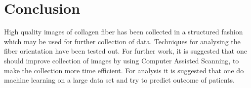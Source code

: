\chapter{Conclusion}
High quality images of collagen fiber has been collected in a structured fashion which may be used for further collection of data. Techniques for analysing the fiber orientation have been tested out. For further work, it is suggested that one should improve collection of images by using Computer Assisted Scanning, to make the collection more time efficient. For analysis it is suggested that one do machine learning on a large data set and try to predict outcome of patients.
